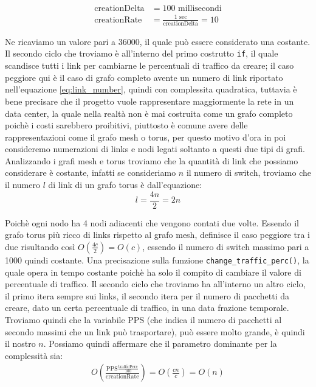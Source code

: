 \documentclass[binding=0.6cm]{sapthesis}
\begin{document}
\begin{align*}
    \text{creationDelta} &=  100 \text{ millisecondi} \\
    \text{creationRate} &= \frac{1 \text{ sec}}{\text{creationDelta}} = 10
\end{align*}

Ne ricaviamo un valore pari a 36000, il quale può essere considerato una costante. Il secondo ciclo che troviamo è all'interno del primo costrutto \lstinline|if|, il quale scandisce tutti i link per cambiarne le percentuali di traffico da creare; il caso peggiore qui è il caso di grafo completo avente un numero di link
riportato nell'equazione \ref{eq:link_number}, quindi con complessita quadratica, tuttavia è bene precisare che il progetto vuole rappresentare maggiormente la rete in un data center, la quale nella realtà non è mai costruita come un grafo completo poichè i costi sarebbero proibitivi, piuttosto è comune avere delle 
rappresentazioni come il grafo mesh o torus, per questo motivo d'ora in poi consideremo numerazioni di links e nodi legati soltanto a questi due tipi di grafi. Analizzando i grafi mesh e torus troviamo che la quantità di link che possiamo considerare è costante, infatti
se consideriamo \(n\) il numero di switch, troviamo che il numero \(l\) di link di un grafo torus è dall'equazione:
\begin{equation}
    l = \frac{4n}{2} = 2n
    \label{eq:torus_link_number}
\end{equation}

Poichè ogni nodo ha 4 nodi adiacenti che vengono contati due volte. Essendo il grafo torus più ricco di links rispetto al grafo mesh, definisce il caso peggiore tra i due risultando così \(O(\frac{4c}{2}) = O(c)\), essendo il numero di switch massimo pari a 1000 quindi costante.
Una precisazione sulla funzione \lstinline|change_traffic_perc()|, la quale opera in tempo costante poichè ha solo il compito di cambiare il valore di percentuale di traffico.
Il secondo ciclo che troviamo ha all'interno un altro ciclo, il primo itera sempre sui links, il secondo itera per il numero di pacchetti da creare, dato un certa percentuale di traffico, in una data frazione temporale.
Troviamo quindi che la variabile PPS (che indica il numero di pacchetti al secondo massimi che un link può trasportare), può essere molto grande, è quindi il nostro \(n\).
Possiamo quindi affermare che il parametro dominante per la complessità sia:
\begin{align}
    O(\frac{\text{PPS}\frac{\text{trafficPerc}}{100}}{\text{creationRate}}) = O(\frac{cn}{c}) = O(n)
    \label{packets_per_fractional_time}
\end{align}
\end{document}
